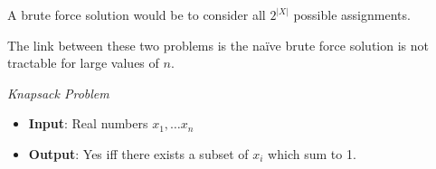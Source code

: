 A brute force solution would be to consider all $2^{|X|}$ possible assignments.

The link between these two problems is the na\"ive brute force solution is not
tractable for large values of $n$.

\textit{Knapsack Problem}\\
\begin{definition}
    \begin{itemize}
        \item \textbf{Input}: Real numbers $x_1,\dots x_n$
        \item \textbf{Output}: Yes iff there exists a subset of $x_i$ which sum to 1.
    \end{itemize}
\end{definition}
